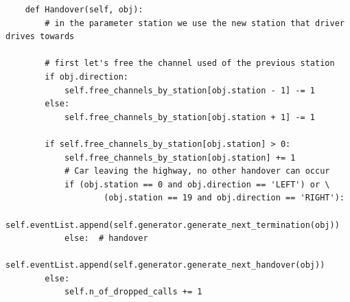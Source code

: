 \documentclass[12pt,a4paper]{article}
\begin{document}
\begin{lstlisting}
    def Handover(self, obj):
        # in the parameter station we use the new station that driver drives towards

        # first let's free the channel used of the previous station
        if obj.direction:
            self.free_channels_by_station[obj.station - 1] -= 1
        else:
            self.free_channels_by_station[obj.station + 1] -= 1

        if self.free_channels_by_station[obj.station] > 0:
            self.free_channels_by_station[obj.station] += 1
            # Car leaving the highway, no other handover can occur
            if (obj.station == 0 and obj.direction == 'LEFT') or \
                    (obj.station == 19 and obj.direction == 'RIGHT'):
                self.eventList.append(self.generator.generate_next_termination(obj))
            else:  # handover
                self.eventList.append(self.generator.generate_next_handover(obj))
        else:
            self.n_of_dropped_calls += 1
\end{lstlisting}
\pagebreak
\end{document}
